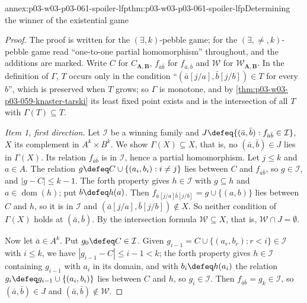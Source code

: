 \begin{annexitem}{annex:p03-w03-p03-061-spoiler-lfp}{thm:p03-w03-p03-061-spoiler-lfp}{Determining the winner of the existential game}
\begin{proof}
The proof is written for the \((\exists,k)\)-pebble game; for the
\((\exists,\neq,k)\)-pebble game read ``one-to-one partial homomorphism''
throughout, and the additions are marked. Write \(C\) for
\(C_{\mathbf A,\mathbf B}\), \(f_{\bar a\bar b}\) for \(f_{\bar a,\bar b}\)
and \(\mathcal W\) for \(\mathcal W_{\mathbf A,\mathbf B}\). In the
definition of \(\Gamma\), \(T\) occurs only in the condition
``\((\bar a[j/a],\bar b[j/b])\in T\) for every \(b\)'', which is preserved
when \(T\) grows; so \(\Gamma\) is monotone, and by
\cref{thm:p03-w03-p03-059-knaster-tarski} its least fixed point exists and is
the intersection of all \(T\) with \(\Gamma(T)\subseteq T\).

\emph{Item 1, first direction.} Let \(\mathcal I\) be a winning family and
\(J\defeq\{(\bar a,\bar b):f_{\bar a\bar b}\in\mathcal I\}\), \(X\) its
complement in \(A^k\times B^k\). We show \(\Gamma(X)\subseteq X\), that is,
no \((\bar a,\bar b)\in J\) lies in \(\Gamma(X)\). Its relation
\(f_{\bar a\bar b}\) is in \(\mathcal I\), hence a partial homomorphism. Let
\(j\le k\) and \(a\in A\). The relation \(g\defeq C\cup\{(a_i,b_i):i\neq j\}\)
lies between \(C\) and \(f_{\bar a\bar b}\), so \(g\in\mathcal I\), and
\(|g-C|\le k-1\). The forth property gives \(h\in\mathcal I\) with
\(g\subseteq h\) and \(a\in\operatorname{dom}(h)\); put \(b\defeq h(a)\).
Then \(f_{\bar a[j/a]\bar b[j/b]}=g\cup\{(a,b)\}\) lies between \(C\) and
\(h\), so it is in \(\mathcal I\) and \((\bar a[j/a],\bar b[j/b])\notin X\).
So neither condition of \(\Gamma(X)\) holds at \((\bar a,\bar b)\). By the
intersection formula \(\mathcal W\subseteq X\), that is, \(\mathcal W\cap
J=\emptyset\).

Now let \(\bar a\in A^k\). Put \(g_0\defeq C\in\mathcal I\). Given
\(g_{i-1}=C\cup\{(a_r,b_r):r<i\}\in\mathcal I\) with \(i\le k\), we have
\(|g_{i-1}-C|\le i-1<k\); the forth property gives \(h\in\mathcal I\)
containing \(g_{i-1}\) with \(a_i\) in its domain, and with
\(b_i\defeq h(a_i)\) the relation \(g_i\defeq g_{i-1}\cup\{(a_i,b_i)\}\) lies
between \(C\) and \(h\), so \(g_i\in\mathcal I\). Then
\(f_{\bar a\bar b}=g_k\in\mathcal I\), so \((\bar a,\bar b)\in J\) and
\((\bar a,\bar b)\notin\mathcal W\).


\end{proof}
\end{annexitem}
